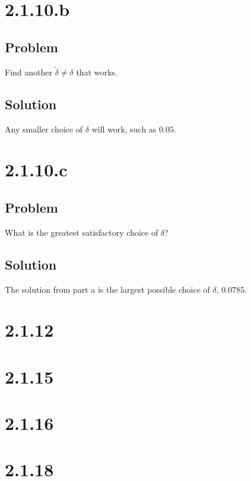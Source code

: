 \documentclass[12pt]{article}
\begin{document}
\section*{2.1.10.b}

\subsection*{Problem}
Find another $\tilde{\delta} \neq \delta$ that works.

\subsection*{Solution}
Any smaller choice of $\delta$ will work, such as $\boxed{0.05}$.



\section*{2.1.10.c}

\subsection*{Problem}
What is the greatest satisfactory choice of $\delta$?

\subsection*{Solution}
The solution from part a is the largest possible choice of $\delta$, $\boxed{0.0785}$.



\section*{2.1.12}
\section*{2.1.15}
\section*{2.1.16}
\section*{2.1.18}
\end{document}
